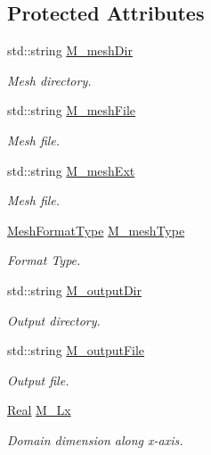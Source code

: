 \subsection*{Protected Attributes}
\begin{DoxyCompactItemize}
\item 
std\+::string \hyperlink{classFVCode3D_1_1Data_ac3c807842fa923bda89a90635b51daea}{M\+\_\+mesh\+Dir}
\begin{DoxyCompactList}\small\item\em Mesh directory. \end{DoxyCompactList}\item 
std\+::string \hyperlink{classFVCode3D_1_1Data_ab939b8425e4b01d2c000adfb0ea2d35a}{M\+\_\+mesh\+File}
\begin{DoxyCompactList}\small\item\em Mesh file. \end{DoxyCompactList}\item 
std\+::string \hyperlink{classFVCode3D_1_1Data_a6808fd51d3a0b46b77ddd500c836abb9}{M\+\_\+mesh\+Ext}
\begin{DoxyCompactList}\small\item\em Mesh file. \end{DoxyCompactList}\item 
\hyperlink{classFVCode3D_1_1Data_a6a9aa6abc2ca3c85be8578d82a61a9c6}{Mesh\+Format\+Type} \hyperlink{classFVCode3D_1_1Data_a3829da70dbf5688d6188ec0108bae59d}{M\+\_\+mesh\+Type}
\begin{DoxyCompactList}\small\item\em Format Type. \end{DoxyCompactList}\item 
std\+::string \hyperlink{classFVCode3D_1_1Data_af5685db93f1e6c697fa63241351d1bcd}{M\+\_\+output\+Dir}
\begin{DoxyCompactList}\small\item\em Output directory. \end{DoxyCompactList}\item 
std\+::string \hyperlink{classFVCode3D_1_1Data_a34713b7f3fd7176b0745f902713722dd}{M\+\_\+output\+File}
\begin{DoxyCompactList}\small\item\em Output file. \end{DoxyCompactList}\item 
\hyperlink{namespaceFVCode3D_a40c1f5588a248569d80aa5f867080e83}{Real} \hyperlink{classFVCode3D_1_1Data_ae5452237bcd372f1f58b338eb81c03c9}{M\+\_\+\+Lx}
\begin{DoxyCompactList}\small\item\em Domain dimension along x-\/axis. \end{DoxyCompactList}\item 

\end{DoxyCompactItemize}
